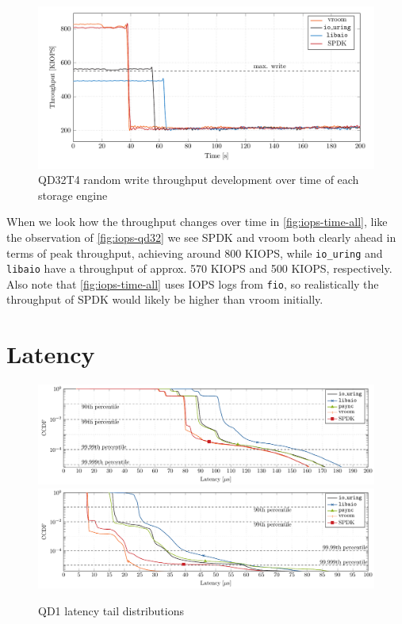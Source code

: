 \begin{figure}
  \centering
    \includegraphics[width=\textwidth]{figures/iops-time-tmp}
    \caption{QD32T4 random write throughput development over time of each storage engine}
    \label{fig:iops-time-all}
\end{figure}

When we look how the throughput changes over time in \autoref{fig:iops-time-all}, like the observation of \autoref{fig:iops-qd32} we see SPDK and vroom both clearly ahead in terms of peak throughput, achieving around 800 KIOPS, while \texttt{io\_uring} and \texttt{libaio} have a throughput of approx. 570 KIOPS and 500 KIOPS, respectively. Also note that \autoref{fig:iops-time-all} uses IOPS logs from \texttt{fio}, so realistically the throughput of SPDK would likely be higher than vroom initially.

\section{Latency}
\begin{figure}
  \centering
   {\includegraphics[width=\textwidth]{figures/latency-ccdf-read} \label{fig:ccdf-read}}
   {\includegraphics[width=\textwidth]{figures/latency-ccdf-write} \label{fig:ccdf-write}}
  \caption{QD1 latency tail distributions}
  \label{fig:ccdf}
\end{figure}

